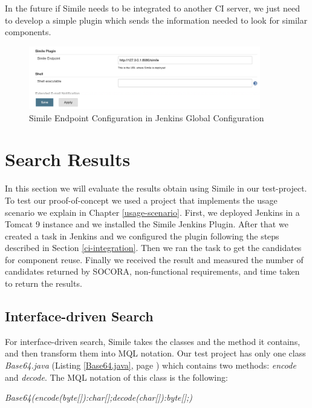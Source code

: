 In the future if Simile needs to be integrated to another CI server, we just need to develop a simple plugin which sends the information needed to look for similar components.

\begin{figure}[H]
	\centering
    \includegraphics[width=0.9\textwidth]{grafiken/simile-conf-02}
    \caption{Simile Endpoint Configuration in Jenkins Global Configuration}
    \label{fig:simile-conf-02}
\end{figure}

\section{Search Results}
In this section we will evaluate the results obtain using Simile in our test-project. To test our proof-of-concept we used a project that implements the usage scenario we explain in Chapter \ref{usage-scenario}. First, we deployed Jenkins in a Tomcat 9 instance and we installed the Simile Jenkins Plugin. After that we created a task in Jenkins and we configured the plugin following the steps described in Section \ref{ci-integration}. Then we ran the task to get the candidates for component reuse. Finally we received the result and measured the number of candidates returned by SOCORA, non-functional requirements, and time taken to return the results.

\subsection{Interface-driven Search}
For interface-driven search, Simile takes the classes and the method it contains, and then transform them into MQL notation. Our test project has only one class \emph{Base64.java} (Listing \ref{Base64.java}, page \pageref{Base64.java}) which contains two methods: \emph{encode} and \emph{decode}. The MQL notation of this class is the following:

\begin{displayquote}
\emph{Base64(encode(byte[]):char[];decode(char[]):byte[];)}
\end{displayquote}

